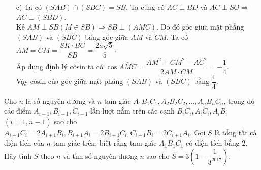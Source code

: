 \begin{bt}
{{}
\begin{enumerate}
\item[c)] Ta có $(SAB)\cap (SBC) = SB.$ Ta cũng có  $AC \perp BD$ và $AC \perp SO \Rightarrow$ $AC \perp (SBD)$.\\
Kẻ  $AM \perp SB (M \in SB) \Rightarrow SB \perp (AMC)$. Do đó góc giữa mặt phẳng $(SAB)$ và $(SBC)$ bằng góc giữa $AM$ và $CM$. Ta có
$AM=CM=\dfrac{SK\cdot BC}{SB} = \dfrac{2a\sqrt{5}}{5}$.\\
Áp dụng định lý côsin ta có $\cos \widehat{AMC} =\dfrac{AM^2+CM^2-AC^2}{2AM \cdot CM}=-\dfrac{1}{4}.$\\
Vậy côsin của góc giữa mặt phẳng $(SAB)$ và $(SBC)$ bằng $\dfrac{1}{4}$.
\end{enumerate}
}
\end{bt}

\begin{bt}%
	Cho $n$ là số nguyên dương và $n$ tam giác $A_1B_1C_1,A_2B_2C_2,...,A_nB_nC_n$, trong đó các điểm $A_{i+1},B_{i+1},C_{i+1}$ lần lượt nằm trên các cạnh $B_iC_i,A_iC_i,A_iB_i$ $(i = \overline{1,n-1})$ sao cho $A_{i+1}C_i = 2A_{i+1}B_i,B_{i+1}A_i = 2B_{i+1}C_i, C_{i+1}B_i=2C_{i+1}A_i$. Gọi $S$ là tổng tất cả diện tích của $n$ tam giác trên, biết rằng tam giác $A_1B_1C_1$ có diện tích bằng $2$. Hãy tính $S$ theo $n$ và tìm số nguyên dương $n$ sao cho $S=3\left(1-\dfrac{1}{3^{2017}}\right)$.
\end{bt}
